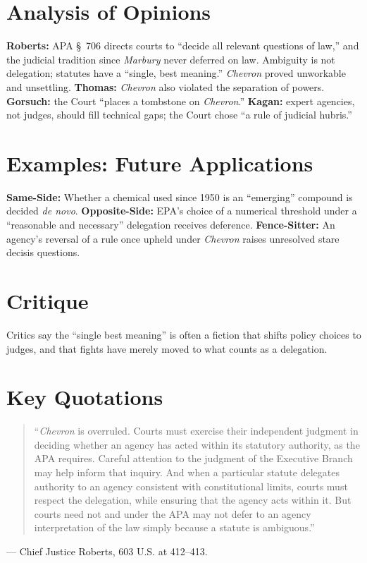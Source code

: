 \documentclass[12pt]{article}
\begin{document}
\section{Analysis of Opinions}
\textbf{Roberts:} APA \S~706 directs courts to ``decide all relevant questions of law,'' and the judicial tradition since \textit{Marbury} never deferred on law. Ambiguity is not delegation; statutes have a ``single, best meaning.'' \textit{Chevron} proved unworkable and unsettling. \textbf{Thomas:} \textit{Chevron} also violated the separation of powers. \textbf{Gorsuch:} the Court ``places a tombstone on \textit{Chevron}.'' \textbf{Kagan:} expert agencies, not judges, should fill technical gaps; the Court chose ``a rule of judicial hubris.''

\section{Examples: Future Applications}
\textbf{Same-Side:} Whether a chemical used since 1950 is an ``emerging'' compound is decided \textit{de novo}. \textbf{Opposite-Side:} EPA's choice of a numerical threshold under a ``reasonable and necessary'' delegation receives deference. \textbf{Fence-Sitter:} An agency's reversal of a rule once upheld under \textit{Chevron} raises unresolved stare decisis questions.

\section{Critique}
Critics say the ``single best meaning'' is often a fiction that shifts policy choices to judges, and that fights have merely moved to what counts as a delegation.

\section{Key Quotations}
\begin{quote}
``\textit{Chevron} is overruled. Courts must exercise their independent judgment in deciding whether an agency has acted within its statutory authority, as the APA requires. Careful attention to the judgment of the Executive Branch may help inform that inquiry. And when a particular statute delegates authority to an agency consistent with constitutional limits, courts must respect the delegation, while ensuring that the agency acts within it. But courts need not and under the APA may not defer to an agency interpretation of the law simply because a statute is ambiguous.''
\end{quote}
\noindent --- Chief Justice Roberts, 603 U.S. at 412--413.
\end{document}
